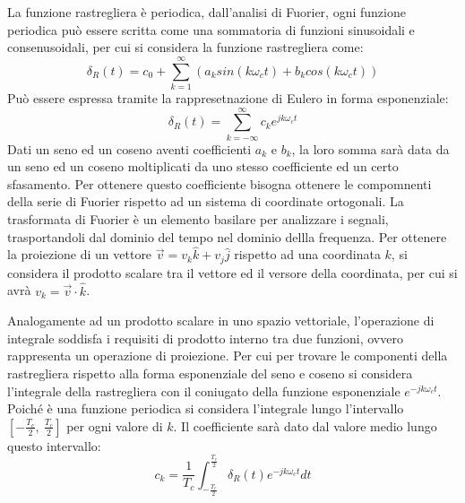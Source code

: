 \documentclass{article}
\numberwithin{equation}{subsection}
\begin{document}
La funzione rastregliera è periodica, dall'analisi di Fuorier, ogni funzione periodica può essere scritta come una sommatoria di funzioni sinusoidali e consenusoidali, per 
cui si considera la funzione rastregliera come:
\begin{equation}
    \delta_R(t)=c_0+\sum_{k=1}^{\infty}\left(a_ksin(k\omega_ct)+b_kcos(k\omega_ct)\right)
\end{equation}
Può essere espressa tramite la rappresetnazione di Eulero in forma esponenziale:
\begin{equation}
    \delta_R(t)=\sum_{k=-\infty}^{\infty}c_ke^{jk\omega_ct}
\end{equation}
Dati un seno ed un coseno aventi coefficienti $a_k$ e $b_k$, la loro somma sarà data da un seno ed un coseno moltiplicati da uno stesso coefficiente ed un certo sfasamento. 
Per ottenere questo coefficiente bisogna ottenere le compomnenti della serie di Fuorier rispetto ad un sistema di coordinate ortogonali. La trasformata di Fuorier è un elemento basilare per analizzare 
i segnali, trasportandoli dal dominio del tempo nel dominio dellla frequenza. Per ottenere la 
proiezione di un vettore $\vec{v}=v_k\hat{k}+v_j\hat{j}$ rispetto ad una coordinata $k$, si considera il prodotto scalare tra il vettore ed il versore della coordinata, 
per cui si avrà $v_k=\vec{v}\cdot\hat{k}$. 

Analogamente ad un prodotto scalare in uno spazio vettoriale, l'operazione di integrale soddisfa i requisiti di prodotto interno tra due funzioni, ovvero rappresenta un 
operazione di proiezione. Per cui per trovare le componenti della rastregliera rispetto alla forma esponenziale del seno e coseno si considera l'integrale della 
rastregliera con il coniugato della funzione esponenziale $e^{-jk\omega_ct}$. Poiché è una funzione periodica si 
considera l'integrale lungo l'intervallo $\left[\displaystyle-\frac{T_c}{2},\:\frac{T_c}{2}\right]$ per ogni valore di $k$. 
Il coefficiente sarà dato dal valore medio lungo questo intervallo: 
\begin{equation}
    c_k=\displaystyle\frac{1}{T_c}\int_{-\frac{T_c}{2}}^{\frac{T_c}{2}}\delta_R(t)e^{-jk\omega_ct}dt
\end{equation}

\end{document}
